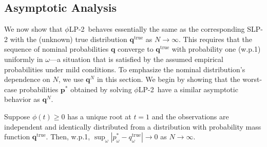 \documentclass[opre,nonblindrev]{informs3} %
\newcommand{\q}{\mathbf{q}}
\newcommand{\p}{\mathbf{p}}
\newcommand{\qtrue}{\q^{\text{true}}}
\newcommand{\plp}{$\phi$LP-2}
\begin{document}
\subsection{Asymptotic Analysis}
\label{ssec:epiconvergence}

We now show that \plp\ behaves essentially the same as the corresponding SLP-2 with the (unknown) true distribution $\qtrue$ as $N\rightarrow \infty$. 
This requires that the sequence of nominal probabilities $\q$ converge to $\qtrue$ with probability one (w.p.1) uniformly in $\omega$---a situation that is satisfied by the assumed empirical probabilities under mild conditions.
To emphasize the nominal distribution's dependence on $N$, we use $\q^N$ in this section. 
We begin by showing that the worst-case probabilities $\p^*$ obtained by solving  \plp\ have a similar asymptotic behavior as $\q^N$. 


\begin{proposition} \label{prop:weak_conv}
	Suppose $\phi(t) \geq 0$ has a unique root at $t = 1$ and the observations are independent and identically distributed from a distribution with probability mass function $\qtrue$. 
	Then, w.p.1, $\sup_\omega |p^*_{\omega} - q^{\text{true}}_\omega| \rightarrow 0$ as $N \rightarrow \infty$. 
\end{proposition}
\end{document}
